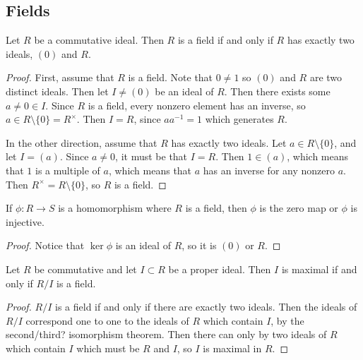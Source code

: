 \subsection{Fields}

\begin{proposition}
Let $R$ be a commutative ideal. Then $R$ is a field if and only if $R$ has exactly two ideals, $(0)$ and $R$.
\end{proposition}

\begin{proof}
First, assume that $R$ is a field. Note that $0 \not= 1$ so $(0)$ and $R$ are two distinct ideals. Then let $I \not= (0)$ be an ideal of $R$. Then there exists some $a \not= 0 \in I$. Since $R$ is a field, every nonzero element has an inverse, so $a \in R \setminus \{0\} = R^\times$. Then $I = R$, since $aa^{-1} = 1$ which generates $R$.

In the other direction, assume that $R$ has exactly two ideals. Let $a \in R\setminus \{0\}$, and let $I = (a)$. Since $a \not= 0$, it must be that $I = R$. Then $1 \in (a)$, which means that $1$ is a multiple of $a$, which means that $a$ has an inverse for any nonzero $a$. Then $R^\times = R \setminus \{0\}$, so $R$ is a field.
\end{proof}

\begin{corollary}
If $\phi : R \to S$ is a homomorphism where $R$ is a field, then $\phi$ is the zero map or $\phi$ is injective. 
\end{corollary}

\begin{proof}
Notice that $\ker \phi$ is an ideal of $R$, so it is $(0)$ or $R$.
\end{proof}

\begin{proposition}
Let $R$ be commutative and let $I \subset R$ be a proper ideal. Then $I$ is maximal if and only if $R/I$ is a field.
\end{proposition}

\begin{proof}
$R/I$ is a field if and only if there are exactly two ideals. Then the ideals of $R/I$ correspond one to one to the ideals of $R$ which contain $I$, by the second/third? isomorphism theorem. Then there can only by two ideals of $R$ which contain $I$ which must be $R$ and $I$, so $I$ is maximal in $R$.
\end{proof}


